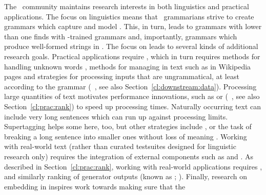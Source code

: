 \documentclass[output=paper,nonflat]{langsci/langscibook}
\begin{document}
The \delphin\ community maintains research interests in both
linguistics and practical applications. The focus on linguistics means
that \delphin\ grammarians strive to create grammars which capture
 and model . This, in turn,
leads to grammars with lower  than one finds with
-trained grammars and, importantly, grammars which produce
well-formed strings in . The focus on 
leads to several kinds of additional research goals. Practical applications
require , which in turn requires methods for handling 
unknown words
\citep[e.g.,][]{chartmapping}, methods for managing  in
text such as in Wikipedia pages \citep[e.g.,][]{FOY2010a-u} and strategies
for processing inputs that are ungrammatical, at least according to
the grammar (\eg\ \citealp{W11-2923}, see also Section~\ref{cl:downstream:data}).
Processing large quantities of text motivates performance innovations, such as  or  (\eg\ \citealp{matsuzaki2007supertag,dridan2013ubertag}, see also Section~\ref{cl:prac:rank}) to speed
up processing times. Naturally occurring text can include very long 
sentences which can run up against processing limits. Supertagging helps some here, too, but other strategies include \textit{}, or the task of breaking a long sentence into smaller ones without loss of meaning \citep{muszynska:2016:ACL-SRW}.
Working with real-world text (rather than curated testsuites designed
for linguistic research only) requires 
the integration of external components such as  
\citep[e.g.,][]{Marimon2013a-u} and  \citep[e.g.,][]{L06-1115,Sch:Usz:Fed:08}. As described in Section~\ref{cl:prac:rank}, working with real-world applications requires  \citep[e.g.,][]{Tou:Man:Fli:Oep:05}, and similarly ranking of generator outputs (known as \textit{}; \citealt[e.g.,][]{Velldal:09}). Finally, research on embedding  in  inspires work  towards making sure that the 
\end{document}
